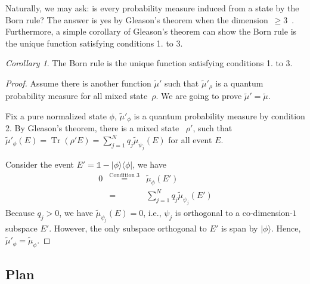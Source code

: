 \documentclass{article}
\theoremstyle{remark}
\newtheorem{cor}{Corollary}
\newcommand{\ket}[1]{|#1\rangle}
\newcommand{\proj}[1]{|#1 \rangle\langle #1 |}
\newcommand{\Tr}{\mathop{\mathrm{Tr}}\nolimits}
\begin{document}
Naturally, we may ask: is every probability measure induced from a
state by the Born rule? The answer is yes by Gleason's theorem when
the dimension~$\ge3$~\cite{gleason1957,peres1995quantum,Redhead1987-REDINA}.
Furthermore, a simple corollary of Gleason's theorem can show the
Born rule is the unique function satisfying conditions 1. to 3.
\begin{cor}
The Born rule is the unique function satisfying conditions 1. to 3.
\end{cor}
\begin{proof}
Assume there is another function $\tilde{\mu}'$ such that $\tilde{\mu}'_{\rho}$
is a quantum probability measure for all mixed state~$\rho$. We
are going to prove $\tilde{\mu}'=\tilde{\mu}$.

Fix a pure normalized state $\phi$, $\tilde{\mu}'_{\phi}$ is a quantum
probability measure by condition 2. By Gleason's theorem, there is
a mixed state ~$\rho'$, such that $\tilde{\mu}'_{\phi}\left(E\right)=\Tr\left(\rho'E\right)=\sum_{j=1}^{N}q_{j}\tilde{\mu}_{\psi_{j}}\left(E\right)$
for all event $E$. 

Consider the event $E'=\mathbb{1}-\proj{\phi}$, we have 
\begin{eqnarray*}
0 & \overset{\textrm{Condition 3}}{=} & \tilde{\mu}_{\phi}\left(E'\right)\\
 & = & \sum_{j=1}^{N}q_{j}\tilde{\mu}_{\psi_{j}}\left(E'\right)
\end{eqnarray*}
Because $q_{j}>0$, we have $\tilde{\mu}_{\psi_{j}}\left(E\right)=0$,
i.e., $\psi_{j}$ is orthogonal to a co-dimension-$1$ subspace $E'$.
However, the only subspace orthogonal to $E'$ is span by $\ket{\phi}$.
Hence, $\tilde{\mu}'_{\phi}=\tilde{\mu}_{\phi}$.
\end{proof}

\subsection{Plan}
\end{document}
